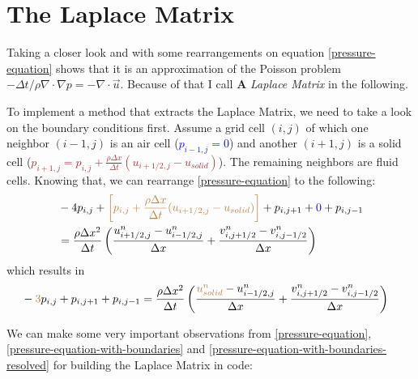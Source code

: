 \newpage

\section{ The Laplace Matrix }
Taking a closer look and with some rearrangements on equation \ref{pressure-equation} shows that it is an approximation of the Poisson problem $-\Delta t / \rho \nabla \cdot \nabla p = - \nabla \cdot \vec{u}$. Because of that I call $\mathbf{A}$ \textit{Laplace Matrix} in the following. 
\par To implement a method that extracts the Laplace Matrix, we need to take a look on the boundary conditions first. Assume a grid cell $(i,j)$ of which one neighbor $(i-1,j)$ is an air cell (\textcolor{blue}{$p_{i-1,j}=0$}) and another $(i+1, j)$ is a solid cell (\textcolor{brown}{$p_{i+1,j}= p_{i,j} + \frac{\rho \Delta x}{\Delta t} (u_{i+1/2,j} - u_{solid})$}). The remaining neighbors are fluid cells. Knowing that, we can rearrange \ref{pressure-equation} to the following:
\begin{equation} \label{pressure-equation-with-boundaries}
    \begin{aligned}
        & -4p_{i,j} + \textcolor{brown}{\left[p_{i,j} + \frac{\rho \Delta x}{\Delta t} (u_{i+1/2,j} - u_{solid}) \right]} + p_{i,j+1} + \textcolor{blue}{0} + p_{i,j-1} \\
        & = \frac{\rho \Delta x^2}{\Delta t} \left( \frac{u_{i+1/2,j}^{n} - u_{i-1/2,j}^{n}}{\Delta x} + \frac{v_{i,j+1/2}^{n} - v_{i,j-1/2}^{n}}{\Delta x} \right)
    \end{aligned}
\end{equation}
which results in
\begin{equation} \label{pressure-equation-with-boundaries-resolved}
    \begin{aligned}
        & - \textcolor{brown}{3}p_{i,j} + p_{i,j+1} + p_{i,j-1} = \frac{\rho \Delta x^2}{\Delta t} \left( \frac{\textcolor{brown}{u_{solid}^{n}} - u_{i-1/2,j}^{n}}{\Delta x} + \frac{v_{i,j+1/2}^{n} - v_{i,j-1/2}^{n}}{\Delta x} \right)
    \end{aligned}
\end{equation}
\par We can make some very important observations from \ref{pressure-equation}, \ref{pressure-equation-with-boundaries} and \ref{pressure-equation-with-boundaries-resolved} for building the Laplace Matrix in code:
